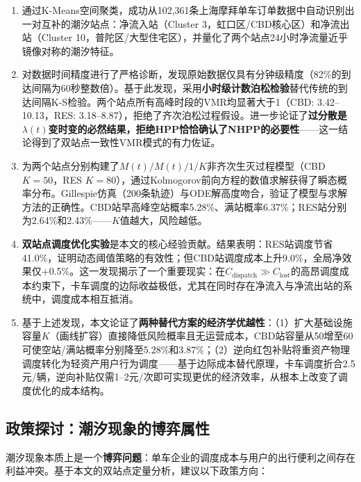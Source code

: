 \documentclass[12pt,a4paper]{article}
\begin{document}
\begin{enumerate}
    \item 通过K-Means空间聚类，成功从102,361条上海摩拜单车订单数据中自动识别出一对互补的潮汐站点：净流入站（Cluster 3，虹口区/CBD核心区）和净流出站（Cluster 10，普陀区/大型住宅区），并量化了两个站点24小时净流量近乎镜像对称的潮汐特征。
    
    \item 对数据时间精度进行了严格诊断，发现原始数据仅具有分钟级精度（82\%的到达间隔为60秒整数倍）。基于此发现，采用\textbf{小时级计数泊松检验}替代传统的到达间隔K-S检验。两个站点所有高峰时段的VMR均显著大于1（CBD: 3.42--10.13，RES: 3.18--8.87），拒绝了齐次泊松过程假设。进一步论证了\textbf{过分散是$\lambda(t)$变时变的必然结果，拒绝HPP恰恰确认了NHPP的必要性}——这一结论得到了双站点一致性VMR模式的有力佐证。
    
    \item 为两个站点分别构建了$M(t)/M(t)/1/K$非齐次生灭过程模型（CBD $K=50$，RES $K=80$），通过Kolmogorov前向方程的数值求解获得了瞬态概率分布。Gillespie仿真（200条轨迹）与ODE解高度吻合，验证了模型与求解方法的正确性。CBD站早高峰空站概率5.28\%、满站概率6.37\%；RES站分别为2.64\%和2.43\%——$K$值越大，风险越低。
    
    \item \textbf{双站点调度优化实验}是本文的核心经验贡献。结果表明：RES站调度节省41.0\%，证明动态阈值策略的有效性；但CBD站调度成本上升9.0\%，全局净效果仅+0.5\%。这一发现揭示了一个重要现实：在$C_{\text{dispatch}} \gg C_{\text{lost}}$的高昂调度成本约束下，卡车调度的边际收益极低，尤其在同时存在净流入与净流出站的系统中，调度成本相互抵消。
    
    \item 基于上述发现，本文论证了\textbf{两种替代方案的经济学优越性}：（1）扩大基础设施容量$K$（画线扩容）直接降低风险概率且无运营成本，CBD站容量从50增至60可使空站/满站概率分别降至5.28\%和3.87\%；（2）逆向红包补贴将重资产物理调度转化为轻资产用户行为调度——基于边际成本替代原理，卡车调度折合2.5元/辆，逆向补贴仅需1--2元/次即可实现更优的经济效率，从根本上改变了调度优化的成本结构。
\end{enumerate}

\subsection{政策探讨：潮汐现象的博弈属性}

潮汐现象本质上是一个\textbf{博弈问题}：单车企业的调度成本与用户的出行便利之间存在利益冲突。基于本文的双站点定量分析，建议以下政策方向：
\end{document}
